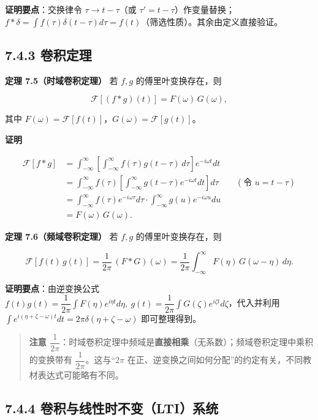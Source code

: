 \textbf{证明要点}：交换律令 \(\tau\to t-\tau\)（或
\(\tau'=t-\tau\)）作变量替换；\(f*\delta=\int f(\tau)\delta(t-\tau)d\tau=f(t)\)（筛选性质）。其余由定义直接验证。

\subsection{7.4.3 卷积定理}\label{ux5377ux79efux5b9aux7406}

\textbf{定理 7.5（时域卷积定理）} 若 \(f,g\) 的傅里叶变换存在，则

\[
\mathcal F\left[(f*g)(t)\right]=F(\omega)\,G(\omega),
\]

其中 \(F(\omega)=\mathcal F[f(t)]\)，\(G(\omega)=\mathcal F[g(t)]\)。

\textbf{证明}

\[
\begin{aligned}
\mathcal F[f*g]
&=\int_{-\infty}^{\infty}\left[\int_{-\infty}^{\infty}f(\tau)g(t-\tau)\,d\tau\right]e^{-i\omega t}dt\\
&=\int_{-\infty}^{\infty}f(\tau)\left[\int_{-\infty}^{\infty}g(t-\tau)e^{-i\omega t}dt\right]d\tau\qquad(\text{令 }u=t-\tau)\\
&=\int_{-\infty}^{\infty}f(\tau)e^{-i\omega\tau}d\tau\cdot\int_{-\infty}^{\infty}g(u)e^{-i\omega u}du\\
&=F(\omega)\,G(\omega).
\end{aligned}
\]

\textbf{定理 7.6（频域卷积定理）} 若 \(f,g\) 的傅里叶变换存在，则

\[
\mathcal F\left[f(t)\,g(t)\right]=\frac{1}{2\pi}\,(F*G)(\omega)
=\frac{1}{2\pi}\int_{-\infty}^{\infty}F(\eta)\,G(\omega-\eta)\,d\eta .
\]

\textbf{证明要点}：由逆变换公式
\(f(t)g(t)=\dfrac{1}{2\pi}\int F(\eta)e^{i\eta t}d\eta,\ g(t)=\dfrac{1}{2\pi}\int G(\zeta)e^{i\zeta t}d\zeta\)，代入并利用
\(\int e^{i(\eta+\zeta-\omega)t}dt=2\pi\delta(\eta+\zeta-\omega)\)
即可整理得到。

\begin{quote}
\textbf{注意
\(\dfrac{1}{2\pi}\)}：时域卷积定理中频域是\textbf{直接相乘}（无系数）；频域卷积定理中乘积的变换带有
\(\dfrac{1}{2\pi}\)。这与``\(2\pi\)
在正、逆变换之间如何分配''的约定有关，不同教材表达式可能略有不同。
\end{quote}

\subsection{7.4.4
卷积与线性时不变（LTI）系统}\label{ux5377ux79efux4e0eux7ebfux6027ux65f6ux4e0dux53d8ltiux7cfbux7edf}

